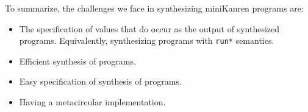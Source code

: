 To summarize, the challenges we face in synthesizing miniKanren programs are:
\begin{itemize}
  \item The specification of values that do occur as the output of synthesized
    programs. Equivalently, synthesizing programs with \Verb|run*| semantics.
  \item Efficient synthesis of programs.
  \item Easy specification of synthesis of programs.
  \item Having a metacircular implementation.
\end{itemize}




















% 
% 
% 

